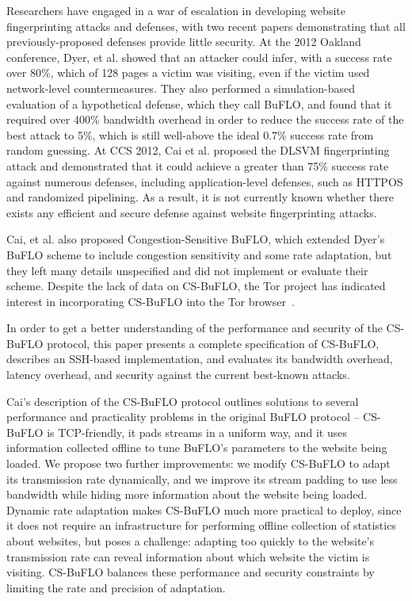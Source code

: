 \documentclass[10pt,journal]{IEEEtran}
\newcommand{\buflo} {BuFLO\xspace}
\newcommand{\csbuflo} {Congestion-Sensitive BuFLO\xspace}
\newcommand{\csb} {CS-BuFLO\xspace}
\begin{document}
Researchers have engaged in a war of escalation in developing website
fingerprinting attacks and defenses, with two recent papers
demonstrating that all previously-proposed defenses provide little
security\cite{dyer-snp12,cai-ccs12}.  At the 2012 Oakland conference,
Dyer, et al. showed that an attacker could infer, with a success rate
over 80\%, which of 128 pages a victim was visiting, even if the
victim used network-level countermeasures.  They also performed a
simulation-based evaluation of a hypothetical defense, which they call
\buflo, and found that it required over 400\% bandwidth overhead in
order to reduce the success rate of the best attack to 5\%, which is
still well-above the ideal 0.7\% success rate from random guessing.
At CCS 2012, Cai et al. proposed the DLSVM fingerprinting attack and
demonstrated that it could achieve a greater than 75\% success rate
against numerous defenses\cite{cai-ccs12}, including application-level
defenses, such as HTTPOS\cite{luo-ndss11} and randomized
pipelining\cite{tor-randomized-pipelining}.  As a result, it is not
currently known whether there exists any efficient and secure defense
against website fingerprinting attacks.

Cai, et al. also proposed \csbuflo, which extended Dyer's \buflo
scheme to include congestion sensitivity and some rate adaptation, but
they left many details unspecified and did not implement or evaluate
their scheme.  Despite the lack of data on \csb, the Tor project has
indicated interest in incorporating \csb into the Tor
browser~\cite{perry-tbdesign,perry-critique}.


In order to get a better understanding of the performance and security
of the \csb protocol, this paper presents a complete specification of
\csb, describes an SSH-based implementation, and evaluates its
bandwidth overhead, latency overhead, and security against the current
best-known attacks.

Cai's description of the \csb protocol outlines solutions to several
performance and practicality problems in the original \buflo protocol
-- \csb is TCP-friendly, it pads streams in a uniform way, and it uses
information collected offline to tune \buflo's parameters to the
website being loaded.  We propose two further improvements: we modify
\csb to adapt its transmission rate dynamically, and we improve its
stream padding to use less bandwidth while hiding more information
about the website being loaded.  Dynamic rate adaptation makes \csb
much more practical to deploy, since it does not require an
infrastructure for performing offline collection of statistics about
websites, but poses a challenge: adapting too quickly to the website's
transmission rate can reveal information about which website the
victim is visiting.  \csb balances these performance and security
constraints by limiting the rate and precision of adaptation.
\end{document}
